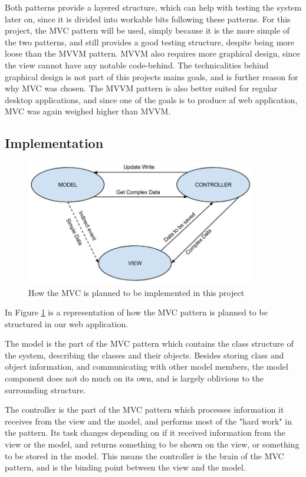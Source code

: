 Both patterns provide a layered structure, which can help with testing the system later on, since it is divided into workable bits following these patterns. For this project, the MVC pattern will be used, simply because it is the more simple of the two patterns, and still provides a good testing structure, despite being more loose than the MVVM pattern. MVVM also requires more graphical design, since the view cannot have any notable code-behind. The technicalities behind graphical design is not part of this projects mains goals, and is further reason for why MVC was chosen. The MVVM pattern is also better suited for regular desktop applications, and since one of the goals is to produce af web application, MVC was again weighed higher than MVVM.

\subsection{Implementation}

\begin{figure}[htb]
\centering
\includegraphics[width=0.9\textwidth]{Images/MVC.jpg}
\caption{How the MVC is planned to be implemented in this project}
\label{MVC}
\end{figure}

In Figure \ref{MVC} is a representation of how the MVC pattern is planned to be structured in our web application.

The model is the part of the MVC pattern which contains the class structure of the system, describing the classes and their objects. Besides storing class and object information, and communicating with other model members, the model component does not do much on its own, and is largely oblivious to the surrounding structure.

The controller is the part of the MVC pattern which processes information it receives from the view and the model, and performs most of the "hard work" in the pattern. Its task changes depending on if it received information from the view or the model, and returns something to be shown on the view, or something to be stored in the model. This means the controller is the brain of the MVC pattern, and is the binding point between the view and the model.

